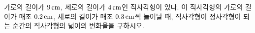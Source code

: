 가로의 길이가 $9\mkern3mu \mathrm{cm}$, 세로의 길이가 $4\mkern3mu \mathrm{cm}$인 직사각형이 있다. 이 직사각형의 가로의 길이가 매초 $0.2\mkern3mu \mathrm{cm}$, 세로의 길이가 매초 $0.3\mkern3mu \mathrm{cm}$씩 늘어날 때, 직사각형이 정사각형이 되는 순간의 직사각형의 넓이의 변화율을 구하시오.

